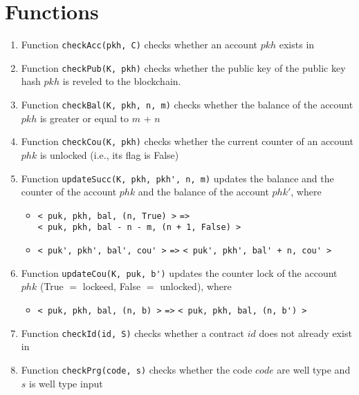 \documentclass[a4paper]{llncs}
\begin{document}
\section{Functions}
\begin{enumerate}
    \item Function \verb!checkAcc(pkh, C)! checks whether an account $pkh$ exists in \ACCOUNTS
    \item Function \verb!checkPub(K, pkh)! checks whether the public key of the public key hash $pkh$ is reveled to the blockchain.
    \item Function \verb!checkBal(K, pkh, n, m)! checks whether the balance of the account $pkh$ is greater or equal to $m$ + $n$
    \item Function \verb!checkCou(K, pkh)! checks whether the current
      counter of an account $phk$ is unlocked (i.e., its flag is False)
    \item Function \verb!updateSucc(K, pkh, pkh', n, m)! updates the balance and the counter of the account $phk$ and the balance of the account $phk'$, where
    \begin{itemize}
        \item  \verb!< puk, pkh, bal, (n, True) >!  \verb!=>! \\ \verb!< puk, pkh, bal - n - m, (n + 1, False) >!
        \item  \verb!< puk', pkh', bal', cou' >! \verb!=>! \verb!< puk', pkh', bal' + n, cou' >!
    \end{itemize}
    
    \item Function \verb!updateCou(K, puk, b')! updates the counter
      lock of the account $phk$ (True $=$ lockeed, False $=$ unlocked), where
    \begin{itemize}
        \item  \verb!< puk, pkh, bal, (n, b) >!  \verb!=>! \verb!< puk, pkh, bal, (n, b') >!
    \end{itemize}
    
    \item Function \verb!checkId(id, S)! checks whether a contract $id$ does not already exist in \CONTRACTS
    
    \item Function \verb!checkPrg(code, s)! checks whether the code $code$ are well type and $s$ is well type input 
    
    

\end{enumerate}
\end{document}

